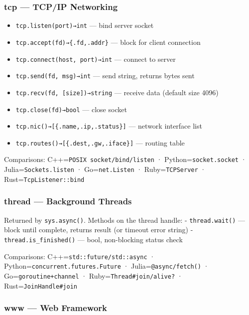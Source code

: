 \documentclass[
]{article}
\providecommand{\tightlist}{%
  \setlength{\itemsep}{0pt}\setlength{\parskip}{0pt}}
\begin{document}
\subsubsection{tcp --- TCP/IP Networking}\label{tcp-tcpip-networking}

\begin{itemize}
\tightlist
\item
  \texttt{tcp.listen(port)→int} --- bind server socket
\item
  \texttt{tcp.accept(fd)→\{.fd,.addr\}} --- block for client connection
\item
  \texttt{tcp.connect(host,\ port)→int} --- connect to server
\item
  \texttt{tcp.send(fd,\ msg)→int} --- send string, returns bytes sent
\item
  \texttt{tcp.recv(fd,\ {[}size{]})→string} --- receive data (default
  size 4096)
\item
  \texttt{tcp.close(fd)→bool} --- close socket
\item
  \texttt{tcp.nic()→{[}\{.name,.ip,.status\}{]}} --- network interface
  list
\item
  \texttt{tcp.routes()→{[}\{.dest,.gw,.iface\}{]}} --- routing table
\end{itemize}

Comparisons: C++=\texttt{POSIX\ socket/bind/listen} ·
Python=\texttt{socket.socket} · Julia=\texttt{Sockets.listen} ·
Go=\texttt{net.Listen} · Ruby=\texttt{TCPServer} ·
Rust=\texttt{TcpListener::bind}

\subsubsection{thread --- Background
Threads}\label{thread-background-threads}

Returned by \texttt{sys.async()}. Methods on the thread handle: -
\texttt{thread.wait()} --- block until complete, returns result (or
timeout error string) - \texttt{thread.is\_finished()} --- bool,
non-blocking status check

Comparisons: C++=\texttt{std::future/std::async} ·
Python=\texttt{concurrent.futures.Future} ·
Julia=\texttt{@async/fetch()} · Go=\texttt{goroutine+channel} ·
Ruby=\texttt{Thread\#join/alive?} · Rust=\texttt{JoinHandle\#join}

\subsubsection{www --- Web Framework}\label{www-web-framework}
\end{document}
